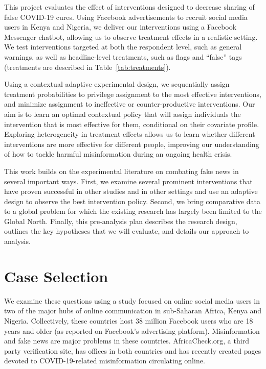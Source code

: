 \documentclass[letterpaper, 12pt, parskip=full,DIV=12]{scrartcl}
\begin{document}
This project evaluates the effect of interventions designed to decrease sharing of false COVID-19 cures. Using Facebook advertisements to recruit social media users in Kenya and Nigeria, we deliver our interventions using a Facebook Messenger chatbot, allowing us to observe treatment effects in a realistic setting. We test interventions targeted at both the respondent level, such as general warnings, as well as headline-level treatments, such as flags and ``false'' tags (treatments are described in Table~\ref{tab:treatments}). 

Using a contextual adaptive experimental design, we sequentially assign treatment probabilities to privilege assignment to the most effective interventions, and minimize assignment to ineffective or counter-productive interventions. Our aim is to learn an optimal contextual policy that will assign individuals the intervention that is most effective for them, conditional on their covariate profile. Exploring heterogeneity in treatment effects allows us to learn whether different interventions are more effective for different people, improving our understanding of how to tackle harmful misinformation during an ongoing health crisis. 

This work builds on the experimental literature on combating fake news in several important ways. First, we examine several prominent interventions that have proven successful in other studies and in other settings and use an adaptive design to observe the best intervention policy. Second, we bring comparative data to a global problem for which the existing research has largely been limited to the Global North. Finally, this pre-analysis plan describes the research design, outlines the key hypotheses that we will evaluate, and details our approach to analysis.




\section{Case Selection}

We examine these questions using a study focused on online social media users in two of the major hubs of online communication in sub-Saharan Africa, Kenya and Nigeria. Collectively, these countries host 38 million Facebook users who are 18 years and older (as reported on Facebook's advertising platform). Misinformation and fake news are major problems in these countries. AfricaCheck.org, a third party verification site, has offices in both countries and has recently created pages devoted to COVID-19-related misinformation circulating online. 
\end{document}

